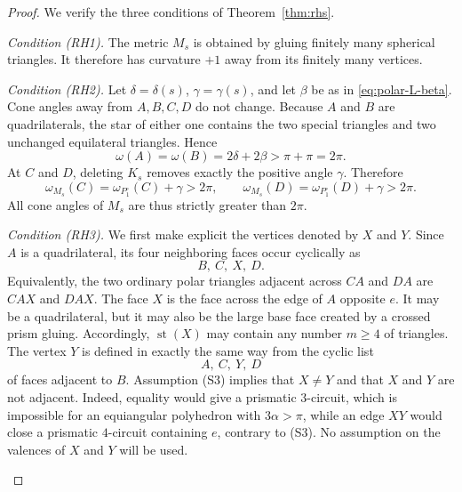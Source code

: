 \documentclass[12pt,a4paper]{article}
\theoremstyle{definition}
\begin{document}
\begin{proof}
We verify the three conditions of Theorem~\ref{thm:rhs}.

\emph{Condition \textup{(RH1)}.}
The metric \(M_s\) is obtained by gluing finitely many spherical triangles.
It therefore has curvature \(+1\) away from its finitely many vertices.

\emph{Condition \textup{(RH2)}.}
Let \(\delta=\delta(s)\), \(\gamma=\gamma(s)\), and let \(\beta\) be as in
\eqref{eq:polar-L-beta}.  Cone angles away from \(A,B,C,D\) do not change.
Because \(A\) and \(B\) are quadrilaterals, the star of either one contains the
two special triangles and two unchanged equilateral triangles.  Hence
\[
        \omega(A)=\omega(B)=2\delta+2\beta
        >\pi+\pi=2\pi .
\]
At \(C\) and \(D\), deleting \(K_s\) removes exactly the positive angle
\(\gamma\).  Therefore
\[
        \omega_{M_s}(C)=\omega_{P_1^\circ}(C)+\gamma>2\pi,
        \qquad
        \omega_{M_s}(D)=\omega_{P_1^\circ}(D)+\gamma>2\pi .
\]
All cone angles of \(M_s\) are thus strictly greater than \(2\pi\).

\emph{Condition \textup{(RH3)}.}
We first make explicit the vertices denoted by \(X\) and \(Y\).  Since \(A\)
is a quadrilateral, its four neighboring faces occur cyclically as
\[
        B,\ C,\ X,\ D.
\]
Equivalently, the two ordinary polar triangles adjacent across \(CA\) and
\(DA\) are \(CAX\) and \(DAX\).  The face \(X\) is the face across the edge of
\(A\) opposite \(e\).  It may be a quadrilateral, but it may also be the large
base face created by a crossed prism gluing.  Accordingly,
\(\operatorname{st}(X)\) may contain any number \(m\ge4\) of triangles.  The
vertex \(Y\) is defined in exactly the same way from the cyclic list
\[
        A,\ C,\ Y,\ D
\]
of faces adjacent to \(B\).  Assumption \textup{(S3)} implies that \(X\ne Y\)
and that \(X\) and \(Y\) are not adjacent.  Indeed, equality would give a
prismatic \(3\)-circuit, which is impossible for an equiangular polyhedron
with \(3\alpha>\pi\), while an edge \(XY\) would close a prismatic
\(4\)-circuit containing \(e\), contrary to \textup{(S3)}.  No assumption on
the valences of \(X\) and \(Y\) will be used.

\begin{figure}[H]
\centering
{}
\end{figure}
\end{proof}
\end{document}
